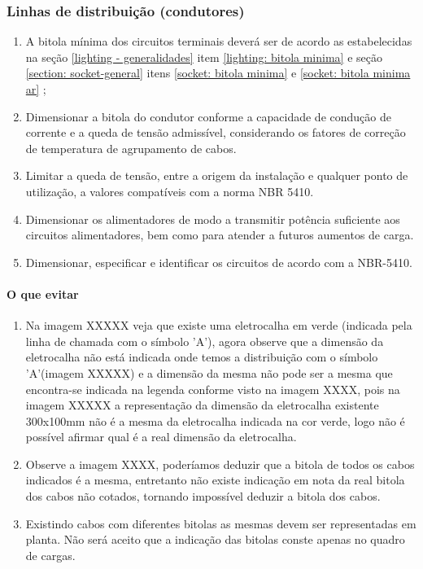 \subsubsection{Linhas de distribuição (condutores)}

\begin{enumerate}
	\item A bitola mínima dos circuitos terminais deverá ser de acordo as estabelecidas na seção \ref{lighting - generalidades} item \ref{lighting: bitola minima} e seção \ref{section: socket-general} itens \ref{socket: bitola minima} e \ref{socket: bitola minima ar} ;

	\item Dimensionar a bitola do condutor conforme a capacidade de condução de corrente e a queda de tensão admissível, considerando os fatores de correção de temperatura de agrupamento de cabos. 

	\item Limitar a queda de tensão, entre a origem da instalação e qualquer ponto de utilização, a valores compatíveis com a norma NBR 5410. 

	\item Dimensionar os alimentadores de modo a transmitir potência suficiente aos circuitos alimentadores, bem como para atender a futuros aumentos de carga. 

	\item Dimensionar, especificar e identificar os circuitos de acordo com a NBR-5410.
	
\end{enumerate}

\paragraph{O que evitar}

\begin{enumerate}
	\item Na imagem XXXXX veja que existe uma eletrocalha em verde (indicada pela linha de chamada com o símbolo 'A'), agora observe que a dimensão da eletrocalha não está indicada onde temos a distribuição com o símbolo 'A'(imagem XXXXX) e a dimensão da mesma não pode ser a mesma que encontra-se indicada na legenda conforme visto na imagem XXXX, pois na imagem XXXXX a representação da dimensão da eletrocalha existente 300x100mm não é a mesma da eletrocalha indicada na cor verde, logo não é possível afirmar qual é a real dimensão da eletrocalha.
	
	\item Observe a imagem XXXX, poderíamos deduzir que a bitola de todos os cabos indicados é a mesma, entretanto não existe indicação em nota da real bitola dos cabos não cotados, tornando impossível deduzir a bitola dos cabos.
	
	\item Existindo cabos com diferentes bitolas as mesmas devem ser representadas em planta. Não será aceito que a indicação das bitolas conste apenas no quadro de cargas.
\end{enumerate}



